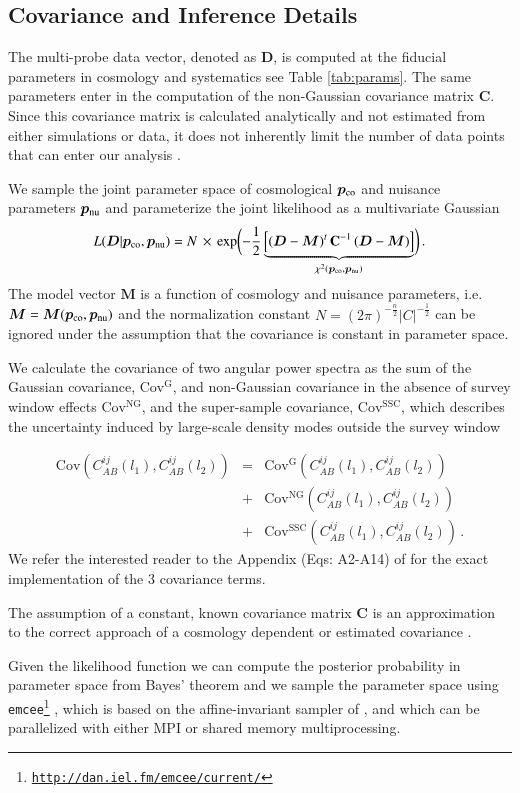 \documentclass[fleqn,usenatbib,useAMS]{mnras}
\newcommand{\bea}{\begin{eqnarray}}
\newcommand{\be}{\begin{equation}}
\newcommand{\eea}{\end{eqnarray}}
\newcommand{\ee}{\end{equation}}
\newcommand{\nn}{\nonumber}
\newcommand{\matC}{\mathbf C}
\newcommand{\like}{L}
\newcommand{\mr}{\mathrm}
\newcommand{\D}{\bm D}
\newcommand{\M}{\bm M}
\newcommand{\pco}{\bm p_{\rm co}}
\newcommand{\pnu}{\bm p_{\rm nu}}
\begin{document}
\subsection{Covariance and Inference Details}
The multi-probe data vector, denoted as $\D$, is computed at the fiducial parameters in cosmology and systematics see Table \ref{tab:params}. The same parameters enter in the computation of the non-Gaussian covariance matrix $\matC$. Since this covariance matrix is calculated analytically and not estimated from either simulations or data, it does not inherently limit the number of data points that can enter our analysis \citep[see e.g.,][for details on these constraints]{tjk13,dos13}. 

We sample the joint parameter space of cosmological $\pco$ and nuisance parameters $\pnu$ and parameterize the joint likelihood as a multivariate Gaussian 
\be
\label{eq:like}
\like (\D| \pco, \pnu) = N \, \times \, \exp \biggl( -\frac{1}{2} \underbrace{\left[ (\D -\M)^t \, \matC^{-1} \, (\D-\M) \right]}_{\chi^2(\pco, \pnu)}  \biggr) \,.
\ee
The model vector $\M$ is a function of cosmology and nuisance parameters, i.e. $\M=\M(\pco, \pnu)$ and the normalization constant $N=(2 \pi)^{-\frac{n}{2}} |C|^{-\frac{1}{2}}$ can be ignored under the assumption that the covariance is constant in parameter space. 

We calculate the covariance of two angular power spectra as the sum of the Gaussian covariance, $ \mr{Cov^G}$, and non-Gaussian covariance in the absence of survey window effects $\mr{Cov^{NG}}$, and the super-sample covariance, $\mr{Cov^{SSC}}$, which describes the uncertainty induced by large-scale density modes outside the survey window

\bea
\mr{Cov}\left( C_{AB}^{ij} (l_1), C_{AB}^{ij}(l_2) \right)  &=& \mr{Cov^G}\left( C_{AB}^{ij}(l_1), C_{AB}^{ij}(l_2) \right) \nn \\
&+&\mr{Cov^{NG}}\left( C_{AB}^{ij}(l_1), C_{AB}^{ij}(l_2) \right)  \nn \\
&+&\mr{Cov^{SSC}}\left( C_{AB}^{ij}(l_1), C_{AB}^{ij}(l_2) \right)\,.
\eea
We refer the interested reader to the Appendix (Eqs: A2-A14) of \citet{kre17} for the exact implementation of the 3 covariance terms.

The assumption of a constant, known covariance matrix $\matC$ is an approximation to the correct approach of a cosmology dependent or estimated covariance \citep[see][for further details]{esh09, seh16}. 
    
Given the likelihood function we can compute the posterior probability in parameter space from Bayes' theorem and we sample the parameter space using \texttt{emcee\footnote{\url{http://dan.iel.fm/emcee/current/}}} \citep{fhg13}, which is based on the  affine-invariant  sampler of  \cite{gow10}, and which can be parallelized with either MPI or shared memory multiprocessing. 
\end{document}
